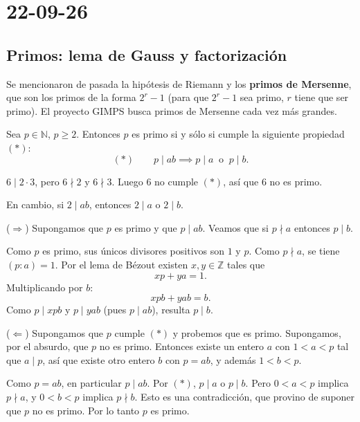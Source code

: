 \chapter{22-09-26}

\section{Primos: lema de Gauss y factorización}

\begin{nota}
Se mencionaron de pasada la hipótesis de Riemann y los \textbf{primos de
Mersenne}, que son los primos de la forma $2^r-1$ (para que $2^r-1$ sea primo,
$r$ tiene que ser primo). El proyecto GIMPS busca primos de Mersenne cada vez
más grandes.
\end{nota}

\begin{proposicion}[{title={Lema de Gauss (lema de Euclides)}}]
Sea $p\in\mathbb{N}$, $p\ge 2$. Entonces $p$ es primo si y sólo si cumple la
siguiente propiedad $(\ast)$:
\[
(\ast)\qquad p \mid ab \implies p\mid a \ \text{ o } \ p\mid b.
\]
\end{proposicion}

\begin{ejemplo}
$6 \mid 2\cdot 3$, pero $6\nmid 2$ y $6\nmid 3$. Luego $6$ no cumple $(\ast)$,
así que $6$ no es primo.

En cambio, si $2\mid ab$, entonces $2\mid a$ o $2\mid b$.
\end{ejemplo}

\begin{demostracion}
($\Rightarrow$) Supongamos que $p$ es primo y que $p\mid ab$. Veamos que si
$p\nmid a$ entonces $p\mid b$.

Como $p$ es primo, sus únicos divisores positivos son $1$ y $p$. Como
$p\nmid a$, se tiene $(p:a)=1$. Por el lema de Bézout existen $x,y\in\mathbb{Z}$
tales que
\[
xp+ya=1.
\]
Multiplicando por $b$:
\[
xpb+yab=b.
\]
Como $p\mid xpb$ y $p\mid yab$ (pues $p\mid ab$), resulta $p\mid b$.

($\Leftarrow$) Supongamos que $p$ cumple $(\ast)$ y probemos que es primo.
Supongamos, por el absurdo, que $p$ no es primo. Entonces existe un entero $a$
con $1<a<p$ tal que $a\mid p$, así que existe otro entero $b$ con $p=ab$, y
además $1<b<p$.

Como $p=ab$, en particular $p\mid ab$. Por $(\ast)$, $p\mid a$ o $p\mid b$.
Pero $0<a<p$ implica $p\nmid a$, y $0<b<p$ implica $p\nmid b$. Esto es una
contradicción, que provino de suponer que $p$ no es primo. Por lo tanto $p$ es
primo.
\end{demostracion}


